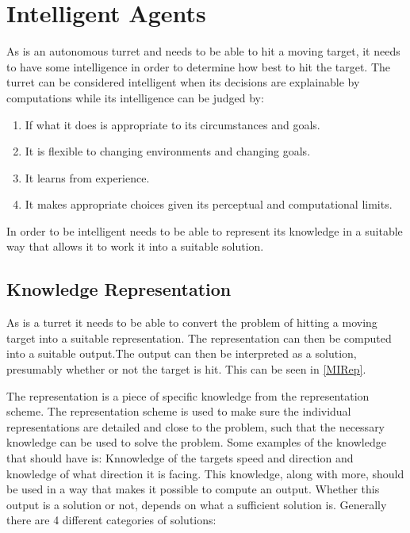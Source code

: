 \section{Intelligent Agents}

As \name is an autonomous turret and needs to be able to hit a moving target,
it needs to have some intelligence in order to determine how best to hit the
target. The turret can be considered intelligent \citep[ch.1.1]{MIBook} when its
decisions are explainable by computations while its intelligence can be judged
by:

\begin{enumerate}
  \item If what it does is appropriate to its circumstances and goals.
  \item It is flexible to changing environments and changing goals.
  \item It learns from experience.
  \item It makes appropriate choices given its perceptual and computational
  limits.
\end{enumerate}

In order to be intelligent \name needs to be able to represent its knowledge in
a suitable way that allows it to work it into a suitable solution.

\subsection{Knowledge Representation}\label{KR}

As \name is a turret it needs to be able to convert the problem of hitting a
moving target into a suitable representation. The representation can then be
computed into a suitable output.The output can then be interpreted as
a solution, presumably whether or not the target is hit. This can be seen in
\autoref{MIRep}.


The representation is a piece of specific knowledge from the representation
scheme. The representation scheme is used to make sure the individual
representations are detailed and close to the problem, such that the necessary
knowledge can be used to solve the problem\citep{MIBook}. Some examples of the
knowledge that \name should have is: Knnowledge of the targets speed and
direction and knowledge of what direction it is facing. This knowledge, along
with more, should be used in a way that makes it possible to compute an output.
Whether this output is a solution or not, depends on what a sufficient solution
is. Generally there are 4 different categories of solutions:

